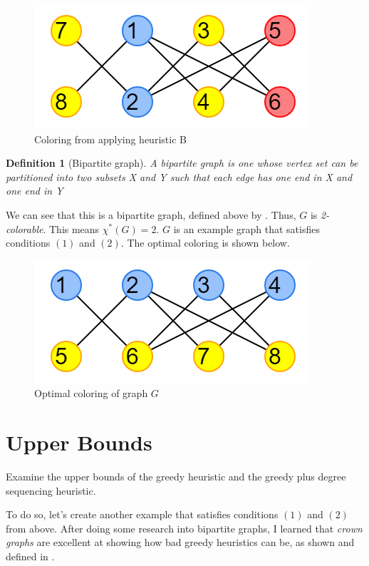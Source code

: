 \documentclass{article}
\newtheorem*{definition}{Definition}
\begin{document}
\begin{figure}[H]
\centering
\includegraphics[scale=0.6]{graph-2.png}
\caption{Coloring from applying heuristic B}
\end{figure}

\begin{definition}[Bipartite graph]
A bipartite graph is one whose vertex set can be partitioned into two subsets X and Y such that each edge has one end in X and one end in Y
\end{definition}

We can see that this is a bipartite graph, defined above by \cite{bondymurty}. Thus, \(G\) is \emph{2-colorable}. This means \(\chi^{*}(G) = 2\). \(G\) is an example graph that satisfies conditions \((1)\) and \((2)\). The optimal coloring is shown below.

\begin{figure}[H]
\centering
\includegraphics[scale=0.6]{graph-3.png}
\caption{Optimal coloring of graph \(G\)}
\end{figure}

\section*{Upper Bounds}
Examine the upper bounds of the greedy heuristic and the greedy plus degree sequencing heuristic. \newline

To do so, let's create another example that satisfies conditions \((1)\) and \((2)\) from above. After doing some research into bipartite graphs, I learned that \emph{crown graphs} are excellent at showing how bad greedy heuristics can be, as shown and defined in \cite{kordecki}.
\end{document}
